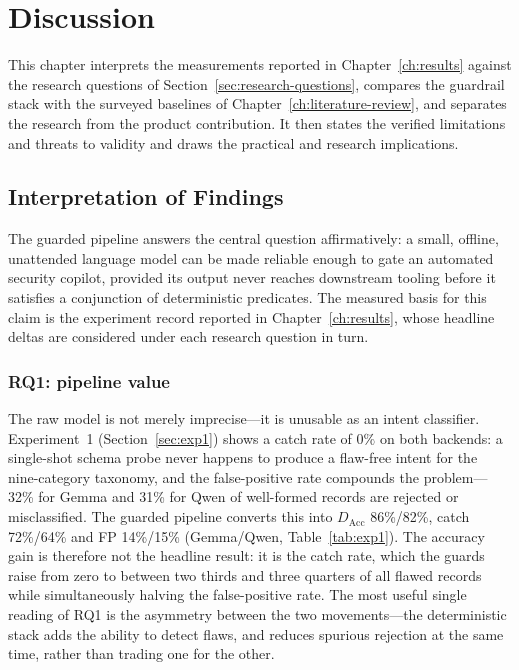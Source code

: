 
\chapter{Discussion}\label{ch:discussion}

This chapter interprets the measurements reported in
Chapter~\ref{ch:results} against the research questions of
Section~\ref{sec:research-questions}, compares the guardrail stack with the
surveyed baselines of Chapter~\ref{ch:literature-review}, and separates the
research from the product contribution. It then states the verified limitations
and threats to validity and draws the practical and research implications.

\section{Interpretation of Findings}\label{sec:discussion-interpretation}

The guarded pipeline answers the central question affirmatively: a small,
offline, unattended language model can be made reliable enough to gate an
automated security copilot, provided its output never reaches downstream
tooling before it satisfies a conjunction of deterministic predicates. The
measured basis for this claim is the experiment record reported in
Chapter~\ref{ch:results}, whose headline deltas are considered under each
research question in turn.

\subsection*{RQ1: pipeline value}

The raw model is not merely imprecise---it is unusable as an intent
classifier. Experiment~1
(Section~\ref{sec:exp1}) shows a catch rate of $0\%$ on both backends:
a single-shot schema probe never happens to produce a flaw-free intent for
the nine-category taxonomy, and the false-positive rate compounds the
problem---32\% for Gemma and 31\% for Qwen of well-formed records are rejected
or misclassified. The guarded pipeline converts this into $D_{\mathrm{Acc}}$
86\%/82\%, catch 72\%/64\% and FP 14\%/15\% (Gemma/Qwen,
Table~\ref{tab:exp1}). The accuracy gain is therefore not the headline
result: it is the catch rate, which the guards raise from zero to between two
thirds and three quarters of all flawed records while simultaneously halving
the false-positive rate. The most useful single reading of RQ1 is the
asymmetry between the two movements---the deterministic stack adds the 
ability to detect flaws, and reduces spurious rejection at the same time,
rather than trading one for the other.


